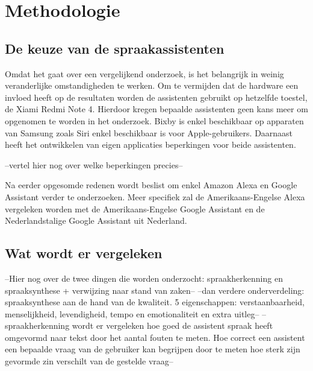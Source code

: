 
\chapter{Methodologie}
\label{ch:methodologie}

\section{De keuze van de spraakassistenten}
Omdat het gaat over een vergelijkend onderzoek, is het belangrijk in weinig veranderlijke omstandigheden te werken. Om te vermijden dat de hardware een invloed heeft op de resultaten worden de assistenten gebruikt op hetzelfde toestel, de Xiami Redmi Note 4. Hierdoor kregen bepaalde assistenten geen kans meer om opgenomen te worden in het onderzoek. Bixby is enkel beschikbaar op apparaten van Samsung zoals Siri enkel beschikbaar is voor Apple-gebruikers. Daarnaast heeft het ontwikkelen van eigen applicaties beperkingen voor beide assistenten.

--vertel hier nog over welke beperkingen precies--

Na eerder opgesomde redenen wordt beslist om enkel Amazon Alexa en Google Assistant verder te onderzoeken. Meer specifiek zal de Amerikaans-Engelse Alexa vergeleken worden met de Amerikaans-Engelse Google Assistant en de Nederlandstalige Google Assistant uit Nederland.


\section{Wat wordt er vergeleken}
\label{sec:vergelijking van stemgestuurde assistenten}
--Hier nog over de twee dingen die worden onderzocht: spraakherkenning en spraaksynthese + verwijzing naar stand van zaken--
--dan verdere onderverdeling: spraaksynthese aan de hand van de kwaliteit. 5 eigenschappen: verstaanbaarheid, menselijkheid, levendigheid, tempo en emotionaliteit en extra uitleg--
--spraakherkenning wordt er vergeleken hoe goed de assistent spraak heeft omgevormd naar tekst door het aantal fouten te meten. Hoe correct een assistent een bepaalde vraag van de gebruiker kan begrijpen door te meten hoe sterk zijn gevormde zin verschilt van de gestelde vraag--


